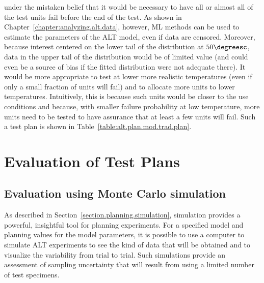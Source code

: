 \begin{example}
under the mistaken belief that it would be necessary to have all or
almost all of the test units fail before the end of the test. As
shown in Chapter~\ref{chapter:analyzing.alt.data}, however, ML
methods can be used to estimate the parameters of the ALT model,
even if data are censored. Moreover, because interest centered on
the lower tail of the distribution at $50\degreesc$, data in the
upper tail of the distribution would be of limited value (and could
even be a source of bias if the fitted distribution were not
adequate there). It would be more appropriate to
test at lower more realistic temperatures (even if only a small
fraction of units will fail) and to allocate more units to lower
temperatures. Intuitively, this is because such units would be
closer to the use conditions and because, with smaller failure
probability at low temperature, more units need to be tested to have
assurance that at least a few units will fail. Such a test plan is
shown in Table~\ref{table:alt.plan.mod.trad.plan}.
\end{example}

\section{Evaluation of Test Plans}
\label{section:alt.plan.eval}
\subsection{Evaluation using Monte Carlo simulation}

As described in Section~\ref{section.planning.simulation}, simulation
provides a powerful, insightful tool for planning experiments. For a
specified model and planning values for the model parameters, it is
possible to use a computer to simulate ALT experiments to see the kind
of data that will be obtained and to visualize the variability from
trial to trial. Such simulations provide an assessment of sampling
uncertainty that will result from using a limited number of test
specimens.

